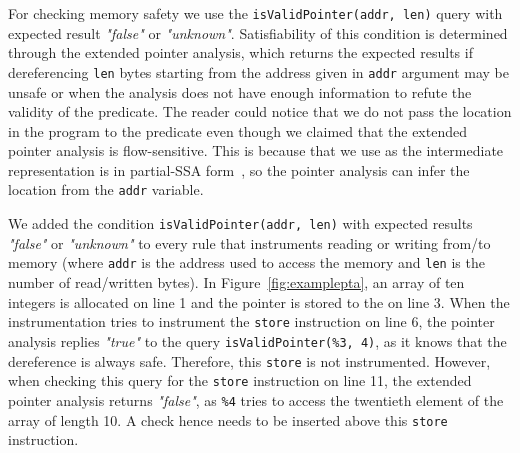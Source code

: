For checking memory safety we use the \texttt{isValidPointer(addr, len)} query
with expected result \emph{"false"} or \emph{"unknown"}. Satisfiability of this
condition is determined through the extended pointer analysis, which returns
the expected results if dereferencing \texttt{len} bytes starting from the
address given in \texttt{addr} argument may be unsafe or when the analysis does
not have enough information to refute the validity of the predicate.  The
reader could notice that we do not pass the location in the program to the
predicate even though we claimed that the extended pointer analysis is
flow-sensitive. This is because \llvm that we use as the intermediate
representation is in partial-SSA form~\cite{Lattner04}, so the pointer analysis
can infer the location from the \texttt{addr} variable.

We added the condition \texttt{isValidPointer(addr, len)} with expected results
\emph{"false"} or \emph{"unknown"} to every rule that instruments reading or
writing from/to memory (where \texttt{addr} is the address used to access the
memory and \texttt{len} is the number of read/written bytes). In
Figure~\ref{fig:examplepta}, an array of ten integers is allocated on line 1
and the pointer is stored to the \stacklist on line 3.  When the
instrumentation tries to instrument the \texttt{store} instruction on line 6,
the pointer analysis replies \emph{"true"} to the query
\texttt{isValidPointer(\%3, 4)}, as it knows that the dereference is always
safe. Therefore, this \texttt{store} is not instrumented. However, when
checking this query for the \texttt{store} instruction on line 11, the extended
pointer analysis returns \emph{"false"}, as \texttt{\%4} tries to access the
twentieth element of the array of length 10. A check hence needs to be inserted
above this \texttt{store} instruction.

